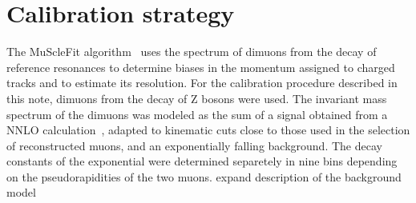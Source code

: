 \section{Calibration strategy}
The MuScleFit algorithm~\cite{CMS_AN_2010-059} uses the spectrum of dimuons from the decay of
reference resonances to determine biases in the momentum assigned to
charged tracks and to estimate its resolution.
For the calibration procedure described in this note, dimuons from the decay of
Z bosons were used. 
The invariant mass spectrum of the dimuons 
was modeled as the sum of a signal obtained from a NNLO
calculation~\cite{Dittmaier:2009cr}, adapted to kinematic cuts close to
those used in the selection of reconstructed muons, and an
exponentially falling background. The decay constants of the
exponential were determined separetely in nine bins depending on the
pseudorapidities of the two muons.
\FIXME expand description of the background model 
